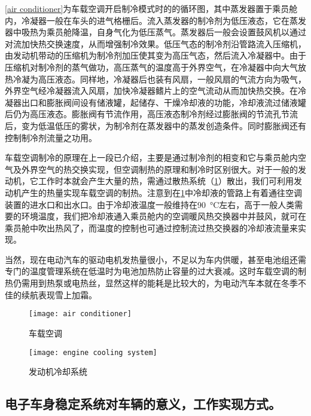 \documentclass[UTF8]{ctexart}
\numberwithin{figure}{section}
\numberwithin{table}{section}
\begin{document}
\cref{air conditioner}为车载空调开启制冷模式时的的循环图，其中蒸发器置于乘员舱内，冷凝器一般在车头的进气格栅后。流入蒸发器的制冷剂为低压液态，它在蒸发器中吸热为乘员舱降温，自身气化为低压蒸气。蒸发器后一般会设置鼓风机以通过对流加快热交换速度，从而增强制冷效果。低压气态的制冷剂沿管路流入压缩机，由发动机带动的压缩机为制冷剂加压使其变为高压气态，然后流入冷凝器中。由于压缩机对制冷剂的蒸气做功，高压蒸气的温度高于外界空气，在冷凝器中向大气放热冷凝为高压液态。同样地，冷凝器后也装有风扇，一般风扇的气流方向为吸气，外界空气经冷凝器流入风扇，加快冷凝器鳍片上的空气流动从而加快热交换。在冷凝器出口和膨胀阀间设有储液罐，起储存、干燥冷却液的功能，冷却液流过储液罐后仍为高压液态。膨胀阀有节流作用，高压液态制冷剂经过膨胀阀的节流孔节流后，变为低温低压的雾状，为制冷剂在蒸发器中的蒸发创造条件。同时膨胀阀还有控制制冷剂流量之功用。

车载空调制冷的原理在上一段已介绍，主要是通过制冷剂的相变和它与乘员舱内空气及外界空气的热交换实现，但空调制热的原理和制冷时区别很大。对于一般的发动机，它工作时本就会产生大量的热，需通过散热系统（\cref{engine cooling system}）散出，我们可利用发动机产生的热量实现车载空调的制热。注意到在\cref{engine cooling system}中冷却液的管路上有着通往空调装置的进水口和出水口。由于冷却液温度一般维持在\SI{90}{\celsius}左右，高于一般人类需要的环境温度，我们把冷却液通入乘员舱内的空调暖风热交换器中并鼓风，就可在乘员舱中吹出热风了，而温度的控制也可通过控制流过热交换器的冷却液流量来实现。

当然，现在电动汽车的驱动电机发热量很小，不足以为车内供暖，甚至电池组还需专门的温度管理系统在低温时为电池加热防止容量的过大衰减。这时车载空调的制热仍需用到热泵或电热丝，显然这样的能耗是比较大的，为电动汽车本就在冬季不佳的续航表现雪上加霜。

\begin{figure}[htbp]
	\centering
	\begin{minipage}[b]{0.8\textwidth}
		\centering
		\texttt{[image: air conditioner]}
		\caption{车载空调}
		\label{air conditioner}
	\end{minipage}
	\begin{minipage}[b]{\textwidth}
		\centering
		\texttt{[image: engine cooling system]}
		\caption{发动机冷却系统}
		\label{engine cooling system}
	\end{minipage}
\end{figure}

\subsection{电子车身稳定系统对车辆的意义，工作实现方式。}
\end{document}
